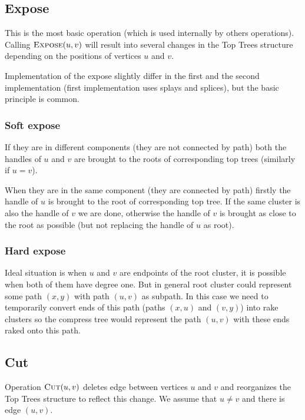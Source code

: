 \subsection{Expose}

This is the most basic operation (which is used internally by others
operations). Calling $\hbox{\sc Expose}(u,v)$ will result into several changes in the Top
Trees structure depending on the positions of vertices $u$ and $v$.

Implementation of the expose slightly differ in the first and the second
implementation (first implementation uses splays and splices), but the basic
principle is common.

\subsubsection{Soft expose}

If they are in different components (they are not connected by path) both the
handles of $u$ and $v$ are brought to the roots of corresponding top trees
(similarly if $u=v$).

When they are in the same component (they are connected by path) firstly the
handle of $u$ is brought to the root of corresponding top tree. If the same
cluster is also the handle of $v$ we are done, otherwise the handle of $v$ is
brought as close to the root as possible (but not replacing the handle of $u$ as
root).

\subsubsection{Hard expose}

Ideal situation is when $u$ and $v$ are endpoints of the root cluster, it is
possible when both of them have degree one. But in general root cluster could
represent some path $(x,y)$ with path $(u,v)$ as subpath. In this case we need
to temporarily convert ends of this path (paths $(x,u)$ and $(v,y)$) into rake
clusters so the compress tree would represent the path $(u,v)$ with these ends
raked onto this path.

\subsection{Cut}

Operation $\hbox{\sc Cut}(u,v)$ deletes edge between vertices $u$ and $v$ and reorganizes
the Top Trees structure to reflect this change. We assume that $u\ne v$ and
there is edge $(u,v)$.

